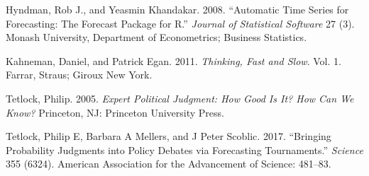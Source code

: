 \documentclass[]{article}
\begin{document}
\hypertarget{refs}{}
\hypertarget{ref-hyndman:khandakar:2008}{}
Hyndman, Rob J., and Yeasmin Khandakar. 2008. ``Automatic Time Series
for Forecasting: The Forecast Package for R.'' \emph{Journal of
Statistical Software} 27 (3). Monash University, Department of
Econometrics; Business Statistics.

\hypertarget{ref-kahneman:2011}{}
Kahneman, Daniel, and Patrick Egan. 2011. \emph{Thinking, Fast and
Slow}. Vol. 1. Farrar, Straus; Giroux New York.

\hypertarget{ref-tetlock:2005}{}
Tetlock, Philip. 2005. \emph{Expert Political Judgment: How Good Is It?
How Can We Know?} Princeton, NJ: Princeton University Press.

\hypertarget{ref-tetlock:etal:2017}{}
Tetlock, Philip E, Barbara A Mellers, and J Peter Scoblic. 2017.
``Bringing Probability Judgments into Policy Debates via Forecasting
Tournaments.'' \emph{Science} 355 (6324). American Association for the
Advancement of Science: 481--83.
\end{document}
